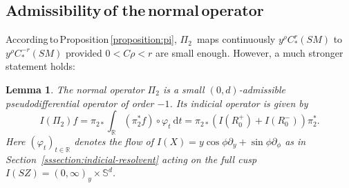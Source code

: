 \documentclass[JEP,XML,SOM,Unicode,NoFloatCountersInSection]{cedram}
\newcommand{\R}{\mathbb{R}}
\newcommand{\Ss}{\mathbb{S}}
\newcommand{\dd}{\mathrm{d}}
\newcommand{\ZZ}{I(SZ)}
\theoremstyle{plain}
\newtheorem{lemma}{Lemma}[section]
\theoremstyle{definition}
\begin{document}
\subsection{Admissibility\,of\,\,the\,normal\,operator}\label{ssection:admissibility}\mbox{}\hspace*{-6pt}
According\,to\,Proposition\,\ref{proposition:pi}, $\Pi_2$~maps continuously $y^\rho C^r_*(SM)$ to $y^\rho C^{-r}_*(SM)$ provided $0< C\rho< r$ are small enough. However, a much stronger statement holds:
\begin{lemma}\label{lemma:Pi2admissible}
The normal operator $\Pi_2$ is a small $(0,d)$-admissible pseudodifferential operator of order $-1$. Its indicial operator is given by
\begin{equation}
\label{eq:indicial-Pi-2}
I(\Pi_2) f = \pi_{2\ast} \int_\R (\pi_2^\ast f)\circ\varphi_t ~\dd t = \pi_{2\ast}(I(R^+_0)+I(R_0^-))\pi_2^\ast.
\end{equation}
Here $(\varphi_t)_{t \in \R}$ denotes the flow of $I(X)= y\cos\phi\partial_y + \sin\phi\partial_\phi$ as in Section~\ref{sssection:indicial-resolvent} acting on the full cusp $\ZZ = (0,\infty)_y \times \Ss^d$.
\end{lemma}
\end{document}

